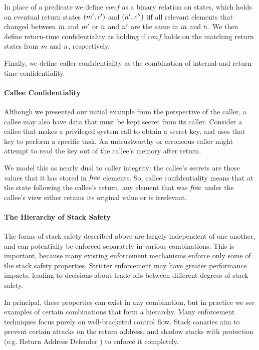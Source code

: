 \documentclass[10pt,conference]{ieeetran}%
\theoremstyle{definition}
\begin{document}
In place of a predicate we define \(\mathit{conf}\) as a binary relation on states, 
which holds on eventual return states \((m',\mathit{c}')\) and
\((n',\mathit{c}'')\)
iff all relevant elements that changed between \(m\) and \(m'\) or \(n\) and \(n'\)
are the same in \(m\) and \(n\). We then define
return-time confidentiality as holding if \(\mathit{conf}\) holds on the matching return states
from \(m\) and \(n\), respectively.

Finally, we define caller confidentiality as the 
combination of internal and return-time confidentiality.

\paragraph*{Callee Confidentiality}

Although we presented our initial example from the perspective of the caller, a callee
may also have data that must be kept secret from its caller. Consider a callee that makes
a privileged system call to obtain a secret key, and uses that key to perform a specific
task. An untrustworthy or erroneous caller might attempt to read the key out of the callee's
memory after return.

We model this as nearly dual to caller integrity: the callee's secrets are those
values that it has stored in \(\mathit{free}\) elements. So, callee confidentiality means that
at the state following the callee's return, any element that was \(\mathit{free}\) under the
callee's view either retains its original value or is irrelevant.

\paragraph*{The Hierarchy of Stack Safety}

The forms of stack safety described above are largely independent of one another, and
can potentially be enforced separately in various combinations. This is important, because
many existing enforcement mechanisms enforce only some of the stack safety
properties. Stricter enforcement may have greater performance impacts, leading to decisions
about trade-offs between different degrees of stack safety.

In principal, these properties can exist in any combination, but in practice we see examples
of certain combinations that form a hierarchy. Many enforcement techniques focus purely on
well-bracketed control flow. Stack canaries aim to prevent certain attacks on the return
address, and shadow stacks with protection (e.g. Return Address Defender \cite{Chiueh2001RAD})
to enforce it completely.
\end{document}
